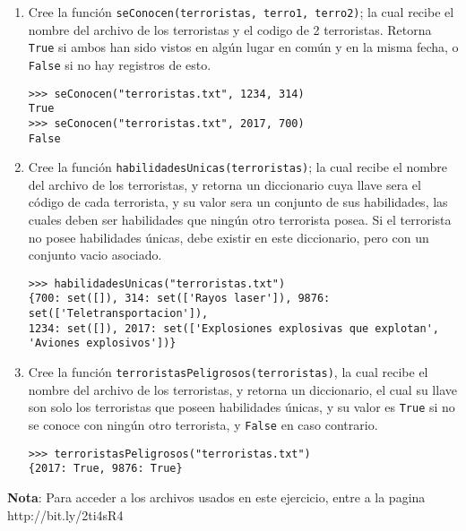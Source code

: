 \begin{enumerate}
\item Cree la función \texttt{seConocen(terroristas, terro1, terro2)}; la cual recibe el nombre del archivo de los terroristas y el codigo de 2 terroristas. Retorna \texttt{True} si ambos han sido vistos en algún lugar en común y en la misma fecha, o \texttt{False} si no hay registros de esto.

\begin{lstlisting}[style=consola]
>>> seConocen("terroristas.txt", 1234, 314)
True
>>> seConocen("terroristas.txt", 2017, 700)
False
\end{lstlisting}

\item Cree la función \texttt{habilidadesUnicas(terroristas)}; la cual recibe el nombre del archivo de los terroristas, y retorna un diccionario cuya llave sera el código de cada terrorista, y su valor sera un conjunto de sus habilidades, las cuales deben ser habilidades que ningún otro terrorista posea. Si el terrorista no posee habilidades únicas, debe existir en este diccionario, pero con un conjunto vacio asociado.

\begin{lstlisting}[style=consola]
>>> habilidadesUnicas("terroristas.txt")
{700: set([]), 314: set(['Rayos laser']), 9876: set(['Teletransportacion']), 
1234: set([]), 2017: set(['Explosiones explosivas que explotan', 
'Aviones explosivos'])}
\end{lstlisting}

\item Cree la función \texttt{terroristasPeligrosos(terroristas)}, la cual recibe el nombre del archivo de los terroristas, y retorna un diccionario, el cual su llave son solo los terroristas que poseen habilidades únicas, y su valor es \texttt{True} si no se conoce con ningún otro terrorista, y \texttt{False} en caso contrario.

\begin{lstlisting}[style=consola]
>>> terroristasPeligrosos("terroristas.txt")
{2017: True, 9876: True}
\end{lstlisting}

\end{enumerate}

\textbf{Nota}: Para acceder a los archivos usados en este ejercicio, entre a la pagina http://bit.ly/2ti4sR4

